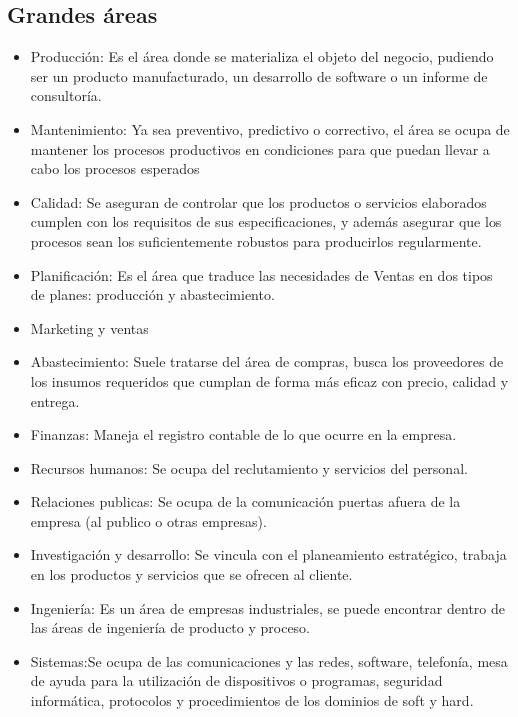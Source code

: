 \documentclass[titlepage,a4paper]{article}
\begin{document}
\subsection{Grandes áreas}
\begin{itemize}
    \item Producción: Es el área donde se materializa el objeto del negocio, pudiendo ser un producto manufacturado, un desarrollo de software o un informe de consultoría.
    \item Mantenimiento: Ya sea preventivo, predictivo o correctivo, el área se ocupa de mantener los procesos productivos en condiciones para que puedan llevar a cabo los procesos esperados
    \item Calidad: Se aseguran de controlar que los productos o servicios elaborados cumplen con los requisitos de sus especificaciones, y además asegurar que los procesos sean los suficientemente robustos para producirlos regularmente.
    \item Planificación: Es el área que traduce las necesidades de Ventas en dos tipos de planes: producción y abastecimiento. 
    \item Marketing y ventas
    \item Abastecimiento: Suele tratarse del área de compras, busca los proveedores de los insumos requeridos que cumplan de forma más eficaz con precio, calidad y entrega.
    \item Finanzas: Maneja el registro contable de lo que ocurre en la empresa.
    \item Recursos humanos: Se ocupa del reclutamiento y servicios del personal.
    \item Relaciones publicas: Se ocupa de la comunicación puertas afuera de la empresa (al publico o otras empresas).
    \item Investigación y desarrollo: Se vincula con el planeamiento estratégico, trabaja en los productos y servicios que se ofrecen al cliente.
    \item Ingeniería: Es un área de empresas industriales, se puede encontrar dentro de las áreas de ingeniería de producto y proceso.
    \item Sistemas:Se ocupa de las comunicaciones y las redes, software, telefonía, mesa de ayuda para la utilización de dispositivos o programas, seguridad informática, protocolos y procedimientos de los dominios de soft y hard.
\end{itemize}
\end{document}
